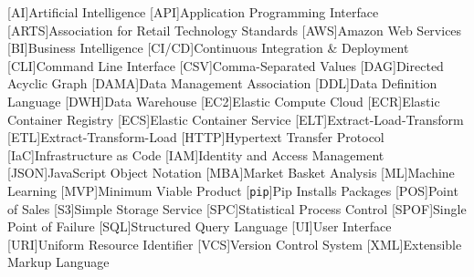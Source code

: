 
\singlespacing
\begin{acronym}[MMMMMM]
	[AI]{Artificial Intelligence}
	[API]{Application Programming Interface}
	[ARTS]{Association for Retail Technology Standards}
	[AWS]{Amazon Web Services}
	[BI]{Business Intelligence}
	[CI/CD]{Continuous Integration \& Deployment}
	[CLI]{Command Line Interface}
	[CSV]{Comma-Separated Values}
	[DAG]{Directed Acyclic Graph}
	[DAMA]{Data Management Association}
	[DDL]{Data Definition Language}
	[DWH]{Data Warehouse}
	[EC2]{Elastic Compute Cloud}
	[ECR]{Elastic Container Registry}
	[ECS]{Elastic Container Service}
	[ELT]{Extract-Load-Transform}
	[ETL]{Extract-Transform-Load}
	[HTTP]{Hypertext Transfer Protocol}
	[IaC]{Infrastructure as Code}
	[IAM]{Identity and Access Management}
	[JSON]{JavaScript Object Notation}
	[MBA]{Market Basket Analysis}
	[ML]{Machine Learning}
	[MVP]{Minimum Viable Product}
	[\texttt{pip}]{Pip Installs Packages}
	[POS]{Point of Sales}
	[S3]{Simple Storage Service}
	[SPC]{Statistical Process Control}
	[SPOF]{Single Point of Failure}
	[SQL]{Structured Query Language}
	[UI]{User Interface}
	[URI]{Uniform Resource Identifier}
	[VCS]{Version Control System}
	[XML]{Extensible Markup Language}
\end{acronym}
\onehalfspacing